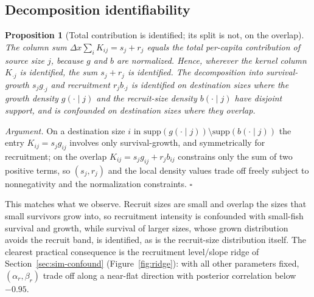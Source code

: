 \documentclass[11pt]{article}
\newtheorem{proposition}{Proposition}
\begin{document}
\subsection{Decomposition identifiability}
\begin{proposition}[Total contribution is identified; its split is not, on the
overlap]
\label{prop:decomp}
The column sum $\Delta x\sum_i K_{ij}=s_j+r_j$ equals the total per-capita
contribution of source size $j$, because $g$ and $b$ are normalized. Hence,
wherever the kernel column $K_{\cdot j}$ is identified, the sum $s_j+r_j$ is
identified. The decomposition into survival-growth $s_j g_{\cdot j}$ and
recruitment $r_j b_{\cdot j}$ is identified on destination sizes where the
growth density $g(\cdot\mid j)$ and the recruit-size density $b(\cdot\mid j)$
have disjoint support, and is confounded on destination sizes where they
overlap.
\end{proposition}
\noindent\emph{Argument.} On a destination size $i$ in $\mathrm{supp}(g(\cdot\mid
j))\setminus\mathrm{supp}(b(\cdot\mid j))$ the entry $K_{ij}=s_j g_{ij}$ involves
only survival-growth, and symmetrically for recruitment; on the overlap
$K_{ij}=s_j g_{ij}+r_j b_{ij}$ constrains only the sum of two positive terms, so
$(s_j,r_j)$ and the local density values trade off freely subject to
nonnegativity and the normalization constraints. $\square$

\smallskip
This matches what we observe. Recruit sizes are small and overlap the sizes that
small survivors grow into, so recruitment intensity is confounded with small-fish
survival and growth, while survival of larger sizes, whose grown distribution
avoids the recruit band, is identified, as is the recruit-size distribution
itself. The clearest practical consequence is the recruitment level/slope ridge
of Section~\ref{sec:sim-confound} (Figure~\ref{fig:ridge}): with all other
parameters fixed, $(\alpha_r,\beta_r)$ trade off along a near-flat direction with
posterior correlation below $-0.95$.
\end{document}
